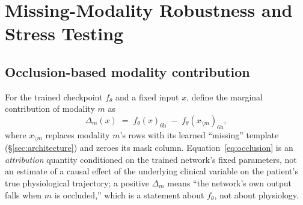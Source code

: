 \documentclass[11pt]{article}
\newcommand{\1}[1]{\mathbf{1}\!\left[#1\right]}
\begin{document}
\section{Missing-Modality Robustness and Stress Testing}\label{sec:missingness}

\subsection{Occlusion-based modality contribution}

For the trained checkpoint $f_\theta$ and a fixed input $x$, define the marginal contribution of modality $m$ as
\begin{equation}
\Delta_m(x) \;=\; f_\theta(x)_{6\mathrm h} \;-\; f_\theta(x_{\setminus m})_{6\mathrm h}, \label{eq:occlusion}
\end{equation}
where $x_{\setminus m}$ replaces modality $m$'s rows with its learned ``missing'' template (\S\ref{sec:architecture}) and zeroes its mask column. Equation~\eqref{eq:occlusion} is an \emph{attribution} quantity conditioned on the trained network's fixed parameters, not an estimate of a causal effect of the underlying clinical variable on the patient's true physiological trajectory; a positive $\Delta_m$ means ``the network's own output falls when $m$ is occluded,'' which is a statement about $f_\theta$, not about physiology.
\end{document}
